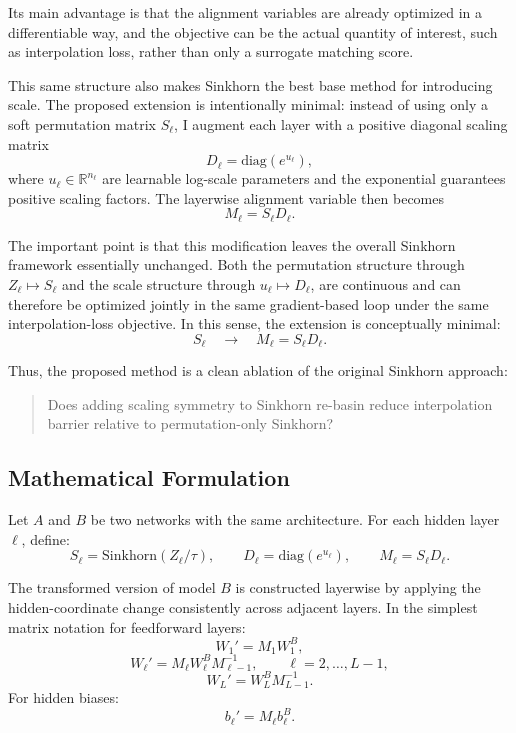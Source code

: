 \documentclass[11pt,a4paper]{article}
\begin{document}
Its main advantage is that the alignment variables are already optimized in a differentiable way, and the objective can be the actual quantity of interest, such as interpolation loss, rather than only a surrogate matching score.

This same structure also makes Sinkhorn the best base method for introducing scale. The proposed extension is intentionally minimal: instead of using only a soft permutation matrix \(S_\ell\), I augment each layer with a positive diagonal scaling matrix
\[
D_\ell = \mathrm{diag}(e^{u_\ell}),
\]
where \(u_\ell \in \mathbb{R}^{n_\ell}\) are learnable log-scale parameters and the exponential guarantees positive scaling factors. The layerwise alignment variable then becomes
\[
M_\ell = S_\ell D_\ell.
\]

The important point is that this modification leaves the overall Sinkhorn framework essentially unchanged. Both
the permutation structure through \(Z_\ell \mapsto S_\ell\) and the scale structure through \(u_\ell \mapsto D_\ell\), are continuous and can therefore be optimized jointly in the same gradient-based loop under the same interpolation-loss objective. In this sense, the extension is conceptually minimal:
\[
S_\ell
\quad \longrightarrow \quad
M_\ell = S_\ell D_\ell.
\]

Thus, the proposed method is a clean ablation of the original Sinkhorn approach:
\begin{quote}
Does adding scaling symmetry to Sinkhorn re-basin reduce interpolation barrier relative to permutation-only Sinkhorn?
\end{quote}

\subsection{Mathematical Formulation}

Let \(A\) and \(B\) be two networks with the same architecture. For each hidden layer \(\ell\), define:
\[
S_\ell = \mathrm{Sinkhorn}(Z_\ell / \tau),
\qquad
D_\ell = \mathrm{diag}(e^{u_\ell}),
\qquad
M_\ell = S_\ell D_\ell.
\]

The transformed version of model \(B\) is constructed layerwise by applying the hidden-coordinate change consistently across adjacent layers. In the simplest matrix notation for feedforward layers:
\[
W_1' = M_1 W_1^B,
\]
\[
W_\ell' = M_\ell W_\ell^B M_{\ell-1}^{-1},
\qquad \ell = 2, \dots, L-1,
\]
\[
W_L' = W_L^B M_{L-1}^{-1}.
\]
For hidden biases:
\[
b_\ell' = M_\ell b_\ell^B.
\]
\end{document}
